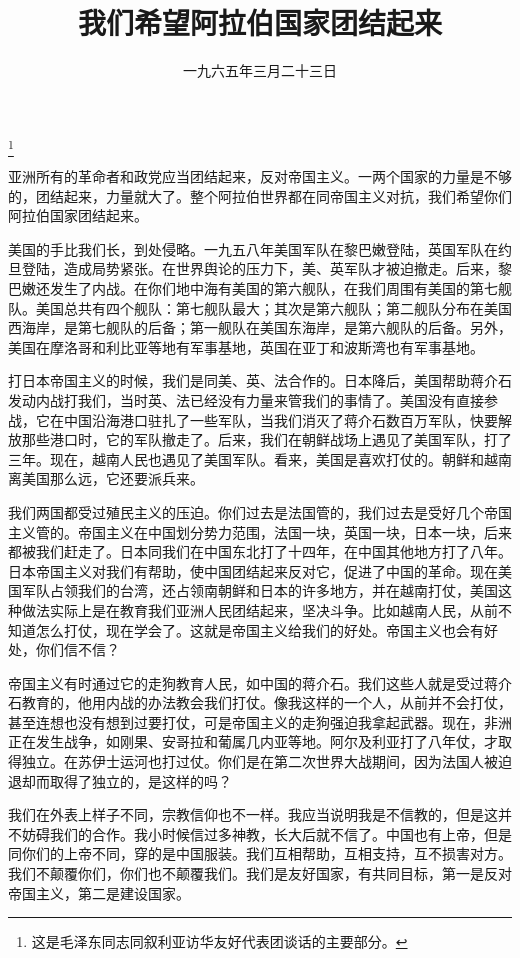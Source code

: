 
\title{我们希望阿拉伯国家团结起来}
\date{一九六五年三月二十三日}
\thanks{这是毛泽东同志同叙利亚访华友好代表团谈话的主要部分。}
\maketitle


亚洲所有的革命者和政党应当团结起来，反对帝国主义。一两个国家的力量是不够的，团结起来，力量就大了。整个阿拉伯世界都在同帝国主义对抗，我们希望你们阿拉伯国家团结起来。

美国的手比我们长，到处侵略。一九五八年美国军队在黎巴嫩登陆，英国军队在约旦登陆，造成局势紧张。在世界舆论的压力下，美、英军队才被迫撤走。后来，黎巴嫩还发生了内战。在你们地中海有美国的第六舰队，在我们周围有美国的第七舰队。美国总共有四个舰队：第七舰队最大；其次是第六舰队；第二舰队分布在美国西海岸，是第七舰队的后备；第一舰队在美国东海岸，是第六舰队的后备。另外，美国在摩洛哥和利比亚等地有军事基地，英国在亚丁和波斯湾也有军事基地。

打日本帝国主义的时候，我们是同美、英、法合作的。日本降后，美国帮助蒋介石发动内战打我们，当时英、法已经没有力量来管我们的事情了。美国没有直接参战，它在中国沿海港口驻扎了一些军队，当我们消灭了蒋介石数百万军队，快要解放那些港口时，它的军队撤走了。后来，我们在朝鲜战场上遇见了美国军队，打了三年。现在，越南人民也遇见了美国军队。看来，美国是喜欢打仗的。朝鲜和越南离美国那么远，它还要派兵来。

我们两国都受过殖民主义的压迫。你们过去是法国管的，我们过去是受好几个帝国主义管的。帝国主义在中国划分势力范围，法国一块，英国一块，日本一块，后来都被我们赶走了。日本同我们在中国东北打了十四年，在中国其他地方打了八年。日本帝国主义对我们有帮助，使中国团结起来反对它，促进了中国的革命。现在美国军队占领我们的台湾，还占领南朝鲜和日本的许多地方，并在越南打仗，美国这种做法实际上是在教育我们亚洲人民团结起来，坚决斗争。比如越南人民，从前不知道怎么打仗，现在学会了。这就是帝国主义给我们的好处。帝国主义也会有好处，你们信不信？

帝国主义有时通过它的走狗教育人民，如中国的蒋介石。我们这些人就是受过蒋介石教育的，他用内战的办法教会我们打仗。像我这样的一个人，从前并不会打仗，甚至连想也没有想到过要打仗，可是帝国主义的走狗强迫我拿起武器。现在，非洲正在发生战争，如刚果、安哥拉和葡属几内亚等地。阿尔及利亚打了八年仗，才取得独立。在苏伊士运河也打过仗。你们是在第二次世界大战期间，因为法国人被迫退却而取得了独立的，是这样的吗？

我们在外表上样子不同，宗教信仰也不一样。我应当说明我是不信教的，但是这并不妨碍我们的合作。我小时候信过多神教，长大后就不信了。中国也有上帝，但是同你们的上帝不同，穿的是中国服装。我们互相帮助，互相支持，互不损害对方。我们不颠覆你们，你们也不颠覆我们。我们是友好国家，有共同目标，第一是反对帝国主义，第二是建设国家。

